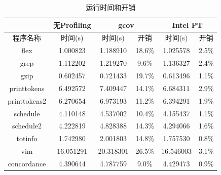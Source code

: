 \begin{table}[ht]
  \centering
  \caption{运行时间和开销}
  \label{tab:9}
  \begin{tabular}{c|c|c|c|c|c}
    \hline
    & 无Profiling& \multicolumn{2}{c|}{gcov}& \multicolumn{2}{c}{Intel PT}\\ \hline
    程序名称& 时间(s)& 时间(s)& 开销& 时间(s)& 开销\\ \hline
    flex& 1.000823& 1.188910&  18.6\%& 1.025578& 2.5\%\\ \hline
    grep& 1.112202& 1.219270&  9.6\%& 1.136327& 2.4\%\\ \hline
    gzip& 0.602457& 0.721433& 19.7\%& 0.613496& 1.1\%\\ \hline
    printtokens& 6.492572& 7.409447& 14.1\%& 6.684311& 2.9\%\\ \hline
    printtokens2& 6.270654& 6.973193& 11.2\%& 6.394291& 1.9\%\\ \hline
    schedule& 4.110148& 4.537002& 10.4\%& 4.155437& 1.1\%\\ \hline
    schedule2& 4.222819& 4.828388& 14.3\%& 4.294066& 1.6\%\\ \hline
    totinfo& 1.742980& 2.001803& 14.8\%& 1.757530& 0.8\%\\ \hline
    vim& 16.051291& 20.318301& 26.5\%& 16.546003& 3.1\%\\ \hline
    concordance& 4.390644& 4.787759& 9.0\%& 4.429473& 0.9\%\\ \hline
  \end{tabular}
\end{table}

